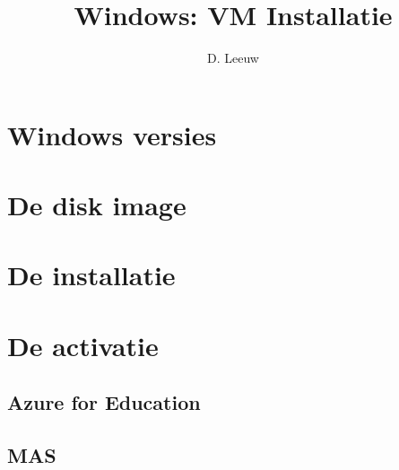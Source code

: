 \documentclass[a4paper,12pt,twoside,titlepage]{article}
\author{D. Leeuw}
\title{Windows: VM Installatie}
\date{\today\\
0.0.0
\vfill
\raggedright
\copyright\ 2026 Dennis Leeuw\\
}
\begin{document}

\maketitle



\section{Windows versies}

\section{De disk image}

\section{De installatie}

\section{De activatie}
\subsection{Azure for Education}

\subsection{MAS}


\printindex
\end{document}
